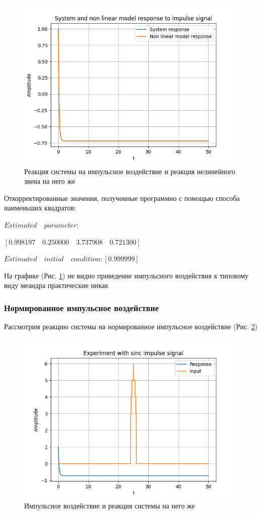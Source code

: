 \begin{figure}[H]
	\centering
	\includegraphics[width=0.8\linewidth]{body/images/System-and-non-linear-model-response-to-impulse-signal.png}
	\caption{Реакция системы на импульсное воздействие и реакция нелинейного звена на него же}
	\label{fig:7}
\end{figure}

Откорректированные значения, полученные программно с помощью способа наименьших квадратов:

$Estimated\quad parameter:$

\qquad$[0.998197\quad 0.250000\quad 3.737908\quad 0.721300]$

$Estimated\quad initial\quad condition: [0.999999]$

На графике (Рис. \ref{fig:7}) не видно приведение импульсного воздействия к типовому виду меандра практические никак

\subsubsection{Нормированное импульсное воздействие}
Рассмотрим реакцию системы на нормированное импульсное воздействие (Рис. \ref{fig:8})

\begin{figure}[H]
	\centering
	\includegraphics[width=0.7\linewidth]{body/images/Experiment-with-sinc-impulse-signal.png}
	\caption{Импульсное воздействие и реакция системы на него же}
	\label{fig:8}
\end{figure}

